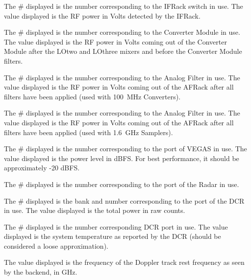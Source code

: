 \begin{description}[leftmargin=*]
\item[{\bf IF}\#:] The \# displayed is the number corresponding to the \gls{IFRack} 
switch in use. The value displayed is the \gls{RF} power in Volts detected by the 
\gls{IFRack}. 
\item[{\bf CM}\#:] The \# displayed is the number corresponding to the Converter 
Module in use. The value displayed is the \gls{RF} power in Volts coming out of the 
Converter Module after the \gls{LOtwo} and \gls{LOthree} mixers and before the Converter
Module filters. 
\item[{\bf CF}\#:] The \# displayed is the number corresponding to the Analog 
Filter in use. The value displayed is the \gls{RF} power in Volts coming out of the 
\gls{AFRack} after all filters have been applied (used with 100~MHz Converters).
\item[{\bf SG}\#:] The \# displayed is the number corresponding to the Analog 
Filter in use. The value displayed is the \gls{RF} power in Volts coming out of the 
\gls{AFRack} after all filters have been applied (used with 1.6~GHz Samplers).
\item[{\bf VEGAS-J}\#:] The \# displayed is the number corresponding to the port 
of \gls{VEGAS} in use. The value displayed is the power level in dBFS. For best
performance, it should be approximately -20 dBFS.
\item[{\bf Radar-Port}\#:] The \# displayed is the number corresponding to the port
of the Radar in use.
\item[{\bf DCR-Port}\#:] The \# displayed is the bank and number corresponding to 
the port of the \gls{DCR} in use. The value displayed is the total power in raw
counts. 
\item[{\bf TSys}\#:] The \# displayed is the number corresponding \gls{DCR} port
in use. The value displayed is the system temperature as reported by the \gls{DCR}
(should be considered a loose approximation).
\item[{\bf backendIF}:] The value displayed is the frequency of the Doppler track 
rest frequency as seen by the backend, in GHz.
\end{description}


 
